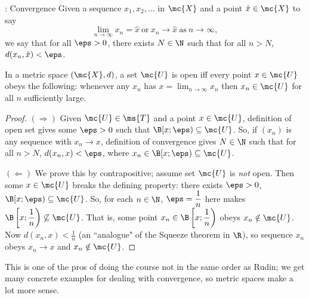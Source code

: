 \begin{ndef}{: Convergence}
	Given a sequence \(x_1,x_2,\dots\) in \(\mc{X}\) and a point \(\hat{x}\in\mc{X}\) to say 
	\begin{equation*}
		\lim_{n\to\infty}x_n=\hat{x}~\text{or}~x_n\to\hat{x}~\text{as}~n\to\infty,
	\end{equation*}
	we say that for all \(\eps>0\), there exists \(N\in\N\) such that for all \(n>N\), \(d(x_n,\hat{x})<\eps\).
\end{ndef}
\begin{nproposition}{}
	In a metric space \((\mc{X},d)\), a set \(\mc{U}\) is open iff every point \(x\in\mc{U}\) obeys the following: whenever any \(x_n\) has \(x=\displaystyle\lim_{n\to\infty}x_n\) then \(x_n\in\mc{U}\) for all \(n\) sufficiently large. 
\end{nproposition}
\begin{proof}
	\((\Rightarrow)\) Given \(\mc{U}\in\ms{T}\) and a point \(x\in\mc{U}\), definition of open set gives some \(\eps>0\) such that \(\B[x;\eps)\subseteq\mc{U}\). So, if \((x_n)\) is any sequence with \(x_n\to x\), definition of convergence gives \(N\in\N\) such that for all \(n>N\), \(d(x_n,x)<\eps\), where \(x_n\in\B[x;\eps)\subseteq\mc{U}\).
	
	\medskip
	
	\((\Leftarrow)\) We prove this by contrapositive; assume set \(\mc{U}\) is \emph{not} open. Then some \(x\in\mc{U}\) breaks the defining property: there exists \(\eps>0\), \(\B[x;\eps)\subseteq\mc{U}\). So, for each \(n\in\N\), \(\eps=\displaystyle\frac{1}{n}\) here makes \(\B\left[x;\displaystyle\frac{1}{n}\right)\not\subseteq\mc{U}\). That is, some point \(x_n\in\B\left[x;\displaystyle\frac{1}{n}\right)\) obeys \(x_n\notin\mc{U}\). Now \(d(x_n,x)<\displaystyle\frac{1}{n}\) (an ``analogue" of the Squeeze theorem in \(\R\)), so sequence \(x_n\) obeys \(x_n\to x\) and \(x_n\notin\mc{U}\).
\end{proof}
\begin{note}
	This is one of the pros of doing the course not in the same order as Rudin; we get many concrete examples for dealing with convergence, so metric spaces make a lot more sense.
\end{note}

